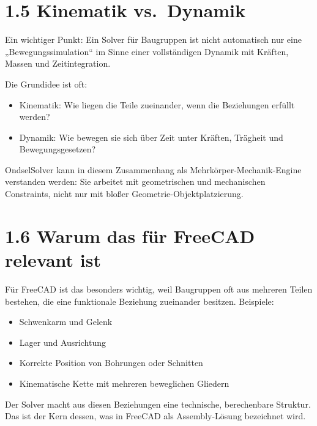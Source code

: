 \documentclass[
  12pt
]{book}
\providecommand{\tightlist}{%
  \setlength{\itemsep}{0pt}\setlength{\parskip}{0pt}}
\begin{document}
\hypertarget{kinematik-vs.-dynamik}{%
\section{\texorpdfstring{{1.5} Kinematik
vs.~Dynamik}{1.5 Kinematik vs.~Dynamik}}\label{kinematik-vs.-dynamik}}

Ein wichtiger Punkt: Ein Solver für Baugruppen ist nicht automatisch nur
eine „Bewegungssimulation`` im Sinne einer vollständigen Dynamik mit
Kräften, Massen und Zeitintegration.

Die Grundidee ist oft:

\begin{itemize}
\tightlist
\item
  Kinematik: Wie liegen die Teile zueinander, wenn die Beziehungen
  erfüllt werden?
\item
  Dynamik: Wie bewegen sie sich über Zeit unter Kräften, Trägheit und
  Bewegungsgesetzen?
\end{itemize}

OndselSolver kann in diesem Zusammenhang als Mehrkörper-Mechanik-Engine
verstanden werden: Sie arbeitet mit geometrischen und mechanischen
Constraints, nicht nur mit bloßer Geometrie-Objektplatzierung.

\hypertarget{warum-das-fuxfcr-freecad-relevant-ist}{%
\section{\texorpdfstring{{1.6} Warum das für FreeCAD relevant
ist}{1.6 Warum das für FreeCAD relevant ist}}\label{warum-das-fuxfcr-freecad-relevant-ist}}

Für FreeCAD ist das besonders wichtig, weil Baugruppen oft aus mehreren
Teilen bestehen, die eine funktionale Beziehung zueinander besitzen.
Beispiele:

\begin{itemize}
\tightlist
\item
  Schwenkarm und Gelenk
\item
  Lager und Ausrichtung
\item
  Korrekte Position von Bohrungen oder Schnitten
\item
  Kinematische Kette mit mehreren beweglichen Gliedern
\end{itemize}

Der Solver macht aus diesen Beziehungen eine technische, berechenbare
Struktur. Das ist der Kern dessen, was in FreeCAD als Assembly-Lösung
bezeichnet wird.
\end{document}
